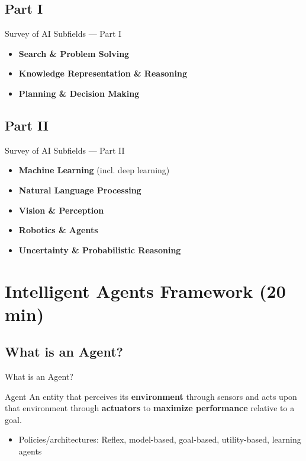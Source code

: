 \documentclass[aspectratio=169]{beamer}
\begin{document}
\subsection{Part I}
\begin{frame}{Survey of AI Subfields — Part I}
\begin{itemize}
  \item \textbf{Search \& Problem Solving}
  \item \textbf{Knowledge Representation \& Reasoning}
  \item \textbf{Planning \& Decision Making}
\end{itemize}
\end{frame}

\subsection{Part II}
\begin{frame}{Survey of AI Subfields — Part II}
\begin{itemize}
  \item \textbf{Machine Learning} (incl. deep learning)
  \item \textbf{Natural Language Processing}
  \item \textbf{Vision \& Perception}
  \item \textbf{Robotics \& Agents}
  \item \textbf{Uncertainty \& Probabilistic Reasoning}
\end{itemize}
\end{frame}

\section{Intelligent Agents Framework (20 min)}

\subsection{What is an Agent?}
\begin{frame}{What is an Agent?}
\begin{block}{Agent}
An entity that perceives its \textbf{environment} through sensors and acts upon that environment through \textbf{actuators} to \textbf{maximize performance} relative to a goal.
\end{block}
\begin{itemize}
  \item Policies/architectures: Reflex, model-based, goal-based, utility-based, learning agents
\end{itemize}
\end{frame}
\end{document}
